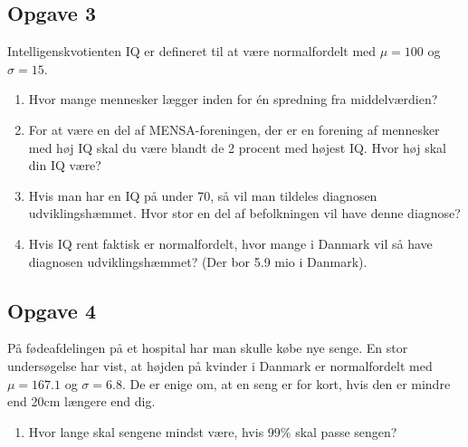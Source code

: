 \subsection*{Opgave 3}

Intelligenskvotienten IQ er defineret til at være normalfordelt med $\mu = 100$ og $\sigma = 15$. 
\begin{enumerate}[label=\roman*)]
	\item Hvor mange mennesker lægger inden for én spredning fra middelværdien?
	\item For at være en del af MENSA-foreningen, der er en forening af mennesker med høj IQ skal du være blandt de 2 procent med højest IQ. Hvor høj skal din IQ være?
	\item Hvis man har en IQ på under 70, så vil man tildeles diagnosen udviklingshæmmet. Hvor stor en del af befolkningen vil have denne diagnose?
	\item Hvis IQ rent faktisk er normalfordelt, hvor mange i Danmark vil så have diagnosen udviklingshæmmet? (Der bor 5.9 mio i Danmark).
\end{enumerate}

\subsection*{Opgave 4}

På fødeafdelingen på et hospital har man skulle købe nye senge. En stor undersøgelse har vist, at højden på kvinder i Danmark er normalfordelt med $\mu = 167.1$ og $\sigma = 6.8$. De er enige om, at en seng er for kort, hvis den er mindre end 20cm længere end dig.
\begin{enumerate}[label=\roman*)]
	\item Hvor lange skal sengene mindst være, hvis 99$\%$ skal passe sengen?
\end{enumerate}



